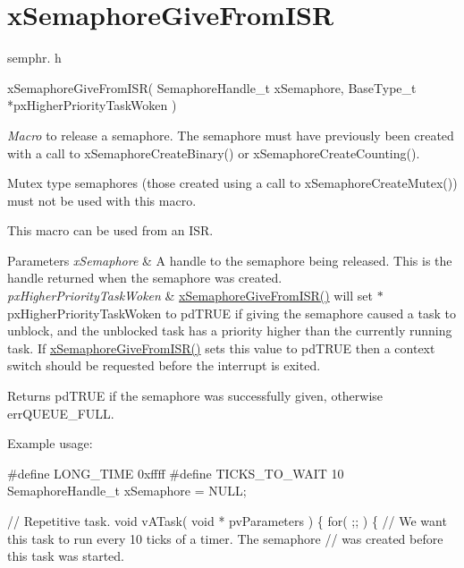 \hypertarget{group__x_semaphore_give_from_i_s_r}{}\section{x\+Semaphore\+Give\+From\+I\+SR}
\label{group__x_semaphore_give_from_i_s_r}
semphr. h 
\begin{DoxyPre}
xSemaphoreGiveFromISR(
                         SemaphoreHandle\_t xSemaphore,
                         BaseType\_t *pxHigherPriorityTaskWoken
                     )\end{DoxyPre}


{\itshape Macro} to release a semaphore. The semaphore must have previously been created with a call to x\+Semaphore\+Create\+Binary() or x\+Semaphore\+Create\+Counting().

Mutex type semaphores (those created using a call to x\+Semaphore\+Create\+Mutex()) must not be used with this macro.

This macro can be used from an I\+SR.


\begin{DoxyParams}{Parameters}
{\em x\+Semaphore} & A handle to the semaphore being released. This is the handle returned when the semaphore was created.\\
\hline
{\em px\+Higher\+Priority\+Task\+Woken} & \hyperlink{semphr_8h_a68aa43df8b2a0dbe17d05fad74670ef0}{x\+Semaphore\+Give\+From\+I\+S\+R()} will set $\ast$px\+Higher\+Priority\+Task\+Woken to pd\+T\+R\+UE if giving the semaphore caused a task to unblock, and the unblocked task has a priority higher than the currently running task. If \hyperlink{semphr_8h_a68aa43df8b2a0dbe17d05fad74670ef0}{x\+Semaphore\+Give\+From\+I\+S\+R()} sets this value to pd\+T\+R\+UE then a context switch should be requested before the interrupt is exited.\\
\hline
\end{DoxyParams}
\begin{DoxyReturn}{Returns}
pd\+T\+R\+UE if the semaphore was successfully given, otherwise err\+Q\+U\+E\+U\+E\+\_\+\+F\+U\+LL.
\end{DoxyReturn}
Example usage\+: 
\begin{DoxyPre}
\#define LONG\_TIME 0xffff
\#define TICKS\_TO\_WAIT  10
SemaphoreHandle\_t xSemaphore = NULL;\end{DoxyPre}



\begin{DoxyPre}// Repetitive task.
void vATask( void * pvParameters )
\{
   for( ;; )
   \{
       // We want this task to run every 10 ticks of a timer.  The semaphore
       // was created before this task was started.\end{DoxyPre}



